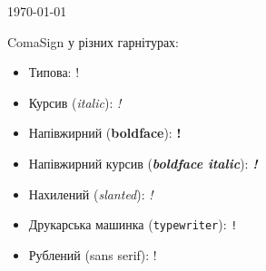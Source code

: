 \documentclass[a5paper, 14pt, oneside]{scrartcl}
\author{Nazar Gerasymchuk}
\newlength{\ComaLen}
\newcommand{\ComaSign}{\settowidth{\ComaLen}{,}!\makebox[\ComaLen]{,\phantom{..}}}
\begin{document}

\today\vspace{2cm}

ComaSign у різних гарнітурах:
\begin{itemize}
	\item Типова: \ComaSign
	\item Курсив (\textit{italic}): \textit{\ComaSign}
	\item Напівжирний (\textbf{boldface}): \textbf{\ComaSign}
	\item Напівжирний курсив (\textbf{\textit{boldface italic}}): \textbf{\textit{\ComaSign}}
	\item Нахилений (\textsl{slanted}): \textsl{\ComaSign}
	\item Друкарська машинка (\texttt{typewriter}): \texttt{\ComaSign}
	\item Рублений (\textsf{sans serif}): \textsf{\ComaSign}
\end{itemize}
\end{document}
